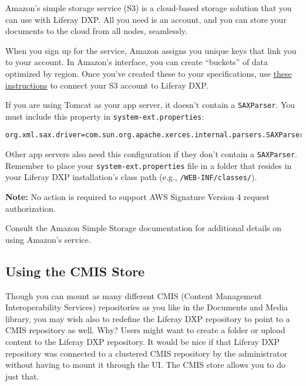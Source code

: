 Amazon's simple storage service (S3) is a cloud-based storage solution
that you can use with Liferay DXP. All you need is an account, and you
can store your documents to the cloud from all nodes, seamlessly.

When you sign up for the service, Amazon assigns you unique keys that
link you to your account. In Amazon's interface, you can create
``buckets'' of data optimized by region. Once you've created these to
your specifications, use
\href{/docs/7-0/deploy/-/knowledge_base/d/document-repository-configuration\#s3}{these
instructions} to connect your S3 account to Liferay DXP.

If you are using Tomcat as your app server, it doesn't contain a
\texttt{SAXParser}. You must include this property in
\texttt{system-ext.properties}:

\begin{verbatim}
org.xml.sax.driver=com.sun.org.apache.xerces.internal.parsers.SAXParser
\end{verbatim}

Other app servers also need this configuration if they don't contain a
\texttt{SAXParser}. Remember to place your
\texttt{system-ext.properties} file in a folder that resides in your
Liferay DXP installation's class path (e.g.,
\texttt{/WEB-INF/classes/}).

\noindent\hrulefill

\textbf{Note:} No action is required to support AWS Signature Version 4
request authorization.

\noindent\hrulefill

Consult the Amazon Simple Storage documentation for additional details
on using Amazon's service.

\subsection{Using the CMIS Store}\label{using-the-cmis-store}

Though you can mount as many different CMIS (Content Management
Interoperability Services) repositories as you like in the Documents and
Media library, you may wish also to redefine the Liferay DXP repository
to point to a CMIS repository as well. Why? Users might want to create a
folder or upload content to the Liferay DXP repository. It would be nice
if that Liferay DXP repository was connected to a clustered CMIS
repository by the administrator without having to mount it through the
UI. The CMIS store allows you to do just that.

